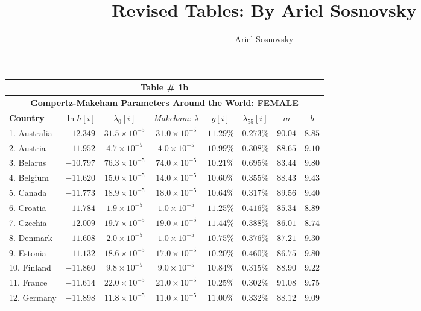 \documentclass[12pt, titlepage]{article}%
\author{Ariel Sosnovsky}
\begin{document}
 \title{Revised Tables: By Ariel Sosnovsky}
 \maketitle
\clearpage
\begin{table}
\begin{center}
\begin{tabular}{||l|c|c|c|c|c|c|c||}
\hline\hline
\multicolumn{8}{||c||}{Table \# 1b } \\ \hline\hline
\multicolumn{8}{||c||}{{\bf Gompertz-Makeham Parameters Around the World: FEMALE}} \\ \hline\hline
{\bf Country} & $\ln h[i]$ & $\lambda_{0}[i]$ & {\em Makeham:} $\lambda$ & $g[i]$ & $\lambda_{55}[i]$ & $m$ & $b$ \\ \hline \hline
1. Australia &  $-12.349$ & $31.5\times10^{-5}$ & $31.0\times10^{-5}$ & $11.29\%$ & $0.273\%$ & $90.04$ & $8.85$\\ \hline
2. Austria &  $-11.952$ & $4.7\times10^{-5}$ & $4.0\times10^{-5}$ & $10.99\%$ & $0.308\%$ & $88.65$ & $9.10$\\ \hline
3. Belarus &  $-10.797$ & $76.3\times10^{-5}$ & $74.0\times10^{-5}$ & $10.21\%$ & $0.695\%$ & $83.44$ & $9.80$\\ \hline
4. Belgium &  $-11.620$ & $15.0\times10^{-5}$ & $14.0\times10^{-5}$ & $10.60\%$ & $0.355\%$ & $88.43$ & $9.43$\\ \hline
5. Canada &  $-11.773$ & $18.9\times10^{-5}$ & $18.0\times10^{-5}$ & $10.64\%$ & $0.317\%$ & $89.56$ & $9.40$\\ \hline
6. Croatia &  $-11.784$ & $1.9\times10^{-5}$ & $1.0\times10^{-5}$ & $11.25\%$ & $0.416\%$ & $85.34$ & $8.89$\\ \hline
7. Czechia &  $-12.009$ & $19.7\times10^{-5}$ & $19.0\times10^{-5}$ & $11.44\%$ & $0.388\%$ & $86.01$ & $8.74$\\ \hline
8. Denmark &  $-11.608$ & $2.0\times10^{-5}$ & $1.0\times10^{-5}$ & $10.75\%$ & $0.376\%$ & $87.21$ & $9.30$\\ \hline
9. Estonia &  $-11.132$ & $18.6\times10^{-5}$ & $17.0\times10^{-5}$ & $10.20\%$ & $0.460\%$ & $86.75$ & $9.80$\\ \hline
10. Finland &  $-11.860$ & $9.8\times10^{-5}$ & $9.0\times10^{-5}$ & $10.84\%$ & $0.315\%$ & $88.90$ & $9.22$\\ \hline
11. France &  $-11.614$ & $22.0\times10^{-5}$ & $21.0\times10^{-5}$ & $10.25\%$ & $0.302\%$ & $91.08$ & $9.75$\\ \hline
12. Germany &  $-11.898$ & $11.8\times10^{-5}$ & $11.0\times10^{-5}$ & $11.00\%$ & $0.332\%$ & $88.12$ & $9.09$\\ \hline

\end{tabular}
\end{center}
\end{table}
\end{document}
